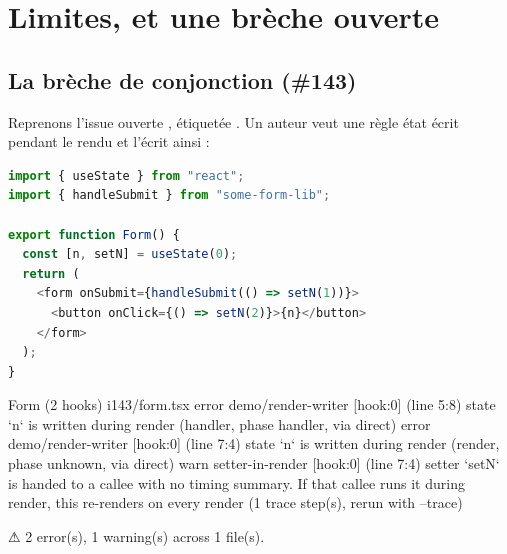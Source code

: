 \section{Limites, et une brèche ouverte}
\label{sec:regles-declaratives-limites}

\subsection{La brèche de conjonction (\#143)}

Reprenons l'issue ouverte , étiquetée . Un auteur veut une règle \Error{} \og état écrit pendant le rendu\fg{} et l'écrit ainsi :



\begin{lstlisting}[language=TypeScript,caption={Un setter confié à une bibliothèque, un autre à un handler (\file{/tmp/ch22/i143/form.tsx})},label={lst:decl-i143-tsx}]
import { useState } from "react";
import { handleSubmit } from "some-form-lib";

export function Form() {
  const [n, setN] = useState(0);
  return (
    <form onSubmit={handleSubmit(() => setN(1))}>
      <button onClick={() => setN(2)}>{n}</button>
    </form>
  );
}
\end{lstlisting}

\begin{sortie}
  Form  (2 hooks)  i143/form.tsx
    error  demo/render-writer  [hook:0]  (line 5:8)  state `n` is written during render (handler, phase handler, via direct)
    error  demo/render-writer  [hook:0]  (line 7:4)  state `n` is written during render (render, phase unknown, via direct)
    warn   setter-in-render  [hook:0]  (line 7:4)  setter `setN` is handed to a callee with no timing summary. If that callee runs it during render, this re-renders on every render
       (1 trace step(s), rerun with --trace)

⚠  2 error(s), 1 warning(s) across 1 file(s).
\end{sortie}

